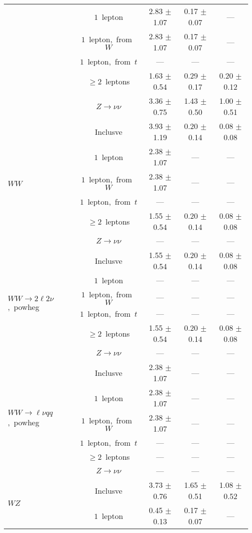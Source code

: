 \documentclass{article}
\begin{document}
\begin{longtable}{|l|c|c|c|c|}
 & $1$~lepton  & 2.83 $\pm$ 1.07  & 0.17 $\pm$ 0.07  & --- \\* 
 & $1$~lepton,~from~$W$  & 2.83 $\pm$ 1.07  & 0.17 $\pm$ 0.07  & --- \\* 
 & $1$~lepton,~from~$t$  & ---  & ---  & --- \\* 
 & $\ge2$~leptons  & 1.63 $\pm$ 0.54  & 0.29 $\pm$ 0.17  & 0.20 $\pm$ 0.12 \\* 
 & $Z\rightarrow\nu\nu$  & 3.36 $\pm$ 0.75  & 1.43 $\pm$ 0.50  & 1.00 $\pm$ 0.51 \\* 
\hline 
\multirow{6}{*}{$WW$} & Inclusve  & 3.93 $\pm$ 1.19  & 0.20 $\pm$ 0.14  & 0.08 $\pm$ 0.08 \\* 
 & $1$~lepton  & 2.38 $\pm$ 1.07  & ---  & --- \\* 
 & $1$~lepton,~from~$W$  & 2.38 $\pm$ 1.07  & ---  & --- \\* 
 & $1$~lepton,~from~$t$  & ---  & ---  & --- \\* 
 & $\ge2$~leptons  & 1.55 $\pm$ 0.54  & 0.20 $\pm$ 0.14  & 0.08 $\pm$ 0.08 \\* 
 & $Z\rightarrow\nu\nu$  & ---  & ---  & --- \\* 
\hline 
\multirow{6}{*}{$WW{\rightarrow}2\ell2\nu$,~powheg} & Inclusve  & 1.55 $\pm$ 0.54  & 0.20 $\pm$ 0.14  & 0.08 $\pm$ 0.08 \\* 
 & $1$~lepton  & ---  & ---  & --- \\* 
 & $1$~lepton,~from~$W$  & ---  & ---  & --- \\* 
 & $1$~lepton,~from~$t$  & ---  & ---  & --- \\* 
 & $\ge2$~leptons  & 1.55 $\pm$ 0.54  & 0.20 $\pm$ 0.14  & 0.08 $\pm$ 0.08 \\* 
 & $Z\rightarrow\nu\nu$  & ---  & ---  & --- \\* 
\hline 
\multirow{6}{*}{$WW{\rightarrow}{\ell}{\nu}qq$,~powheg} & Inclusve  & 2.38 $\pm$ 1.07  & ---  & --- \\* 
 & $1$~lepton  & 2.38 $\pm$ 1.07  & ---  & --- \\* 
 & $1$~lepton,~from~$W$  & 2.38 $\pm$ 1.07  & ---  & --- \\* 
 & $1$~lepton,~from~$t$  & ---  & ---  & --- \\* 
 & $\ge2$~leptons  & ---  & ---  & --- \\* 
 & $Z\rightarrow\nu\nu$  & ---  & ---  & --- \\* 
\hline 
\multirow{6}{*}{$WZ$} & Inclusve  & 3.73 $\pm$ 0.76  & 1.65 $\pm$ 0.51  & 1.08 $\pm$ 0.52 \\* 
 & $1$~lepton  & 0.45 $\pm$ 0.13  & 0.17 $\pm$ 0.07  & --- \\* 

\end{longtable}
\end{document}
